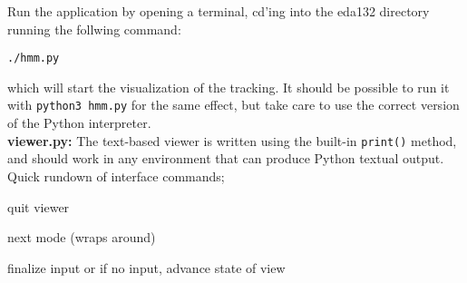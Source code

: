 \documentclass{article}
\begin{document}
    Run the application by opening a terminal, cd'ing into the eda132 directory
    running the follwing command:
    \begin{center}
      \texttt{./hmm.py}
    \end{center}
    which will start the visualization of the tracking. It should be possible
    to run it with \texttt{python3 hmm.py} for the same effect, but take care
    to use the correct version of the Python interpreter. \\

    \textbf{viewer.py:} The text-based viewer is written using the built-in
    \texttt{print()} method, and should work in any environment that can produce
    Python textual output. Quick rundown of interface commands;
    \begin{description}[align=right,labelwidth=3cm]
      \item[q] quit viewer
      \item[t] next mode (wraps around)
      \item[<Enter>] finalize input or if no input, advance state of view
    \end{description}
\end{document}
